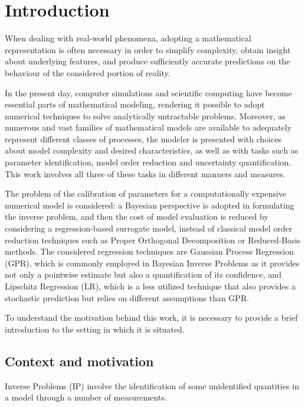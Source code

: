 \section{Introduction} \label{sec:intro}

When dealing with real-world phenomena, adopting a mathematical representation is often necessary in order to simplify complexity, obtain insight about underlying features, and produce sufficiently accurate predictions on the behaviour of the considered portion of reality. 

In the present day, computer simulations and scientific computing have become essential parts of mathematical modeling, rendering it possible to adopt numerical techniques to solve analytically untractable problems.
Moreover, as numerous and vast families of mathematical models are available to adequately represent different classes of processes, the modeler is presented with choices about model complexity and desired characteristics, as well as with tasks such as parameter identification, model order reduction and uncertainty quantification. 
This work involves all three of these tasks in different manners and measures. 

The problem of the calibration of parameters for a computationally expensive numerical model is considered: a Bayesian perspective is adopted in formulating the inverse problem, and then the cost of model evaluation is reduced by considering a regression-based surrogate model, instead of classical model order reduction techniques such as Proper Orthogonal Decomposition or Reduced-Basis methods.
The considered regression techniques are Gaussian Process Regression (GPR), which is commonly employed in Bayesian Inverse Problems as it provides not only a pointwise estimate but also a quantification of its confidence, and Lipschitz Regression (LR), which is a less utilized technique that also provides a stochastic prediction but relies on different assumptions than GPR. 

To understand the motivation behind this work, it is necessary to provide a brief introduction to the setting in which it is situated.

\subsection{Context and motivation}\label{sec:context}

Inverse Problems (IP) involve the identification of some unidentified quantities in a model through a number of measurements.


